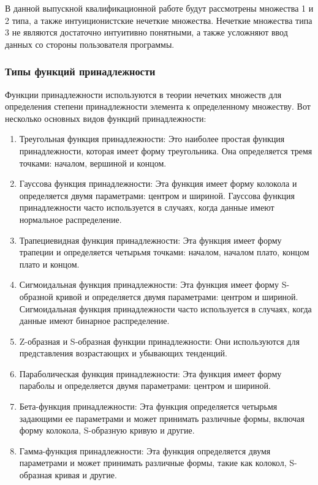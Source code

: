 \documentclass{article}
\begin{document}
    В данной выпускной квалификационной работе будут рассмотрены множества 1 и 2 типа, а также интуиционистские нечеткие множества. Нечеткие множества типа 3 не являются достаточно интуитивно понятными, а также усложняют ввод данных со стороны пользователя программы.

    \subsubsection{Типы функций принадлежности}
    Функции принадлежности используются в теории нечетких множеств для определения степени принадлежности элемента к определенному множеству. Вот несколько основных видов функций принадлежности:
    \begin{enumerate}
        \item Треугольная функция принадлежности: Это наиболее простая функция принадлежности, которая имеет форму треугольника. Она определяется тремя точками: началом, вершиной и концом.
        \item Гауссова функция принадлежности: Эта функция имеет форму колокола и определяется двумя параметрами: центром и шириной. Гауссова функция принадлежности часто используется в случаях, когда данные имеют нормальное распределение.
        \item Трапециевидная функция принадлежности: Эта функция имеет форму трапеции и определяется четырьмя точками: началом, началом плато, концом плато и концом.
        \item Сигмоидальная функция принадлежности: Эта функция имеет форму S-образной кривой и определяется двумя параметрами: центром и шириной. Сигмоидальная функция принадлежности часто используется в случаях, когда данные имеют бинарное распределение.
        \item Z-образная и S-образная функции принадлежности: Они используются для представления возрастающих и убывающих тенденций.
        \item Параболическая функция принадлежности: Эта функция имеет форму параболы и определяется двумя параметрами: центром и шириной.
        \item Бета-функция принадлежности: Эта функция определяется четырьмя задающими ее параметрами и может принимать различные формы, включая форму колокола, S-образную кривую и другие.
        \item Гамма-функция принадлежности: Эта функция определяется двумя параметрами и может принимать различные формы, такие как колокол, S-образная кривая и другие.
    \end{enumerate}
\end{document}
